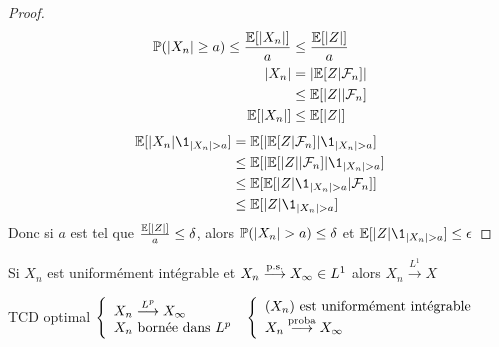 \documentclass[]{report}
\begin{document}
\begin{proof}
\begin{align*}
            \mathbb{P}(|X_n|\ge a)\le \frac{\mathbb{E}[|X_n|]}{a}&\le \frac{\mathbb{E}[|Z|]}{a}\\
            |X_n|&=|\mathbb{E}[Z|\mathcal{F}_n]|\\
            &\le \mathbb{E}[|Z||\mathcal{F}_n]\\
            \mathbb{E}[|X_n|]&\le \mathbb{E}[|Z|]
        \end{align*}
        \begin{align*}
            \Ea[|X_n|\1_{|X_n|>a}]&=\Ea[|\Ea[Z|\Fr_n]|\1_{|X_n|>a}]\\
            &\le \Ea[|\Ea[|Z||\Fr_n]|\1_{|X_n|>a}]\\
            &\le \Ea[\Ea[|Z|\1_{|X_n|>a}|\Fr_n]]\\
            &\le \Ea[|Z|\1_{|X_n|>a}]
        \end{align*}
        Donc si $a $ est tel que $\frac{\mathbb{E}[|Z|]}{a}\le \delta$, alors $\Pa(|X_n|>a)\le \delta$ et $\Ea[|Z|\1_{|X_n|>a}]\le \epsilon$
    \end{proof}

    \begin{re}{}{}
        Si $X_n$ est uniformément intégrable et $X_n\overset{\text{p.s.}}{\longrightarrow} X_\infty\in L^1$ alors $X_n\overset{L^1}{\longrightarrow}X$
    \end{re}

    \begin{tm}{TCD optimal}{}
        $\left\{\begin{array}{ll} X_n\overset{L^p}{\longrightarrow}X_\infty\\X_n\text{ bornée dans $L^p$} \end{array} \right.$ \ssi $\left\{\begin{array}{ll} (X_n)\text{ est uniformément intégrable}\\ X_n\overset{\text{proba}}{\longrightarrow}X_\infty \end{array} \right.$
    \end{tm}
\end{document}
